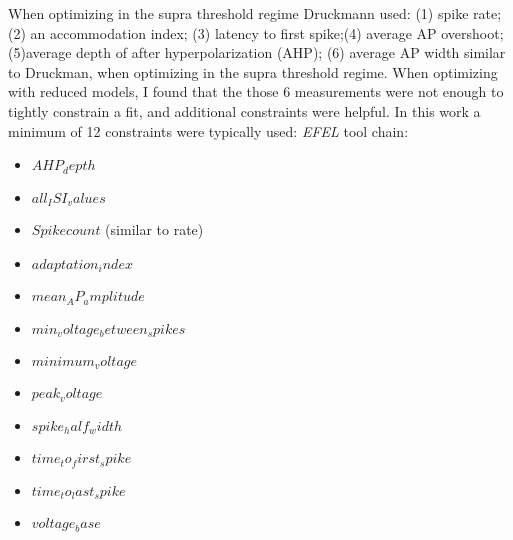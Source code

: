 When optimizing in the supra threshold regime Druckmann used:
(1) spike rate; (2) an accommodation index; (3) latency to first spike;(4) average AP overshoot; (5)average depth of after hyperpolarization (AHP); 
(6) average AP width similar to Druckman, when optimizing in the supra threshold regime.
When optimizing with reduced models, I found that the those 6 measurements were not enough to tightly constrain a fit, and additional constraints were helpful. In this work a minimum of 12 constraints were typically used:
\emph{EFEL} tool chain:
\begin{itemize}
\item $AHP_depth$
\item $all_ISI_values$
\item $Spikecount$ (similar to rate)
\item $adaptation_index$
\item $mean_AP_amplitude$
\item $min_voltage_between_spikes$
\item $minimum_voltage$
\item $peak_voltage$
\item $spike_half_width$
\item $time_to_first_spike$
\item $time_to_last_spike$
\item $voltage_base$
\end{itemize}
